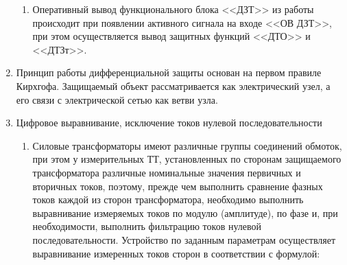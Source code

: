 \documentclass[a4paper, 12pt,table, hidelinks, DIV=calc]{extarticle} %
\begin{document}
\begin{enumerate}[label=\arabic{section}.\arabic{subsection}.\arabic{enumi}, labelsep=4pt, leftmargin=0pt, itemindent=57pt, itemsep=0pt, parsep=5pt]
\begin{enumerate}[label=\arabic{section}.\arabic{subsection}.\arabic{enumi}.\arabic*, labelsep=4pt, leftmargin=0em, itemindent=65pt, parsep=0pt]
\item
Оперативный вывод функционального блока <<ДЗТ>> из работы происходит при появлении активного сигнала на входе <<ОВ ДЗТ>>, при этом осуществляется вывод защитных функций <<ДТО>> и <<ДТЗт>>. 
\end{enumerate}
\item
Принцип работы дифференциальной защиты основан на первом правиле Кирхгофа. Защищаемый объект рассматривается как электрический узел, а его связи с электрической сетью как ветви узла.


\item  Цифровое выравнивание, исключение токов нулевой последовательности

\begin{enumerate}[label=\arabic{section}.\arabic{subsection}.\arabic{enumi}.\arabic*, labelsep=4pt, leftmargin=0em, itemindent=65pt, parsep=0pt]

\item
Силовые трансформаторы имеют различные группы соединений обмоток, при этом у измерительных ТТ, установленных по сторонам защищаемого трансформатора различные номинальные значения первичных и вторичных токов, поэтому, прежде чем выполнить сравнение фазных токов каждой из сторон трансформатора, необходимо выполнить выравнивание измеряемых токов по модулю (амплитуде), по фазе и, при необходимости, выполнить фильтрацию токов нулевой последовательности.
Устройство по заданным параметрам осуществляет выравнивание измеренных токов сторон в соответствии с формулой:


\end{enumerate}
\end{enumerate}
\end{document}
